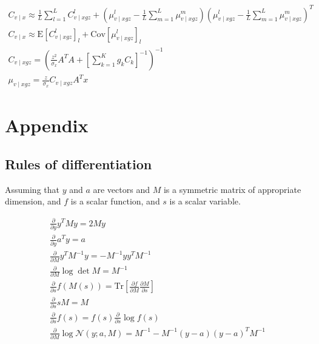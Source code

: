 \documentclass{paper}
\begin{document}
\begin{eqnarray}
C_{v \mid x} \approx \frac{1}{L} \sum_{l=1}^L C_{v \mid xgz}^l + ( \mu_{v \mid xgz}^l - \frac{1}{L} \sum_{m=1}^L \mu_{v \mid xgz}^m) ( \mu_{v \mid xgz}^l - \frac{1}{L} \sum_{m=1}^L \mu_{v \mid xgz}^m)^T \\
C_{v \mid x} \approx \mathrm{E} \left[ C_{v \mid xgz}^l \right]_l + \mathrm{Cov} \left[\mu_{v \mid xgz}^l \right]_l \\
C_{v \mid xgz} =  \left(\frac{z^2}{\sigma_x} A^T A + \left[\sum_{k=1}^K g_k C_k \right]^{-1}\right)^{-1} \\
\mu_{v \mid xgz} = \frac{z}{\sigma_x} C_{v \mid xgz} A^T x
\end{eqnarray}

\section{Appendix}

\subsection{Rules of differentiation}

Assuming that $y$ and $a$ are vectors and $M$ is a symmetric matrix of appropriate dimension, and $f$ is a scalar function, and $s$ is a scalar variable.

\begin{eqnarray}
\frac{\partial}{\partial y} y^T M y = 2 M y \label{eq:deriv_quadratic} \\
\frac{\partial}{\partial y} a^T y = a \label{eq:deriv_scalarprod} \\
\frac{\partial}{\partial M} y^T M^{-1} y = - M^{-1} yy^T M^{-1} \label{eq:deriv_quad_mat} \\
\frac{\partial}{\partial M} \log \det M = M^{-1} \label{eq:deriv_logdet} \\
\frac{\partial}{\partial s} f(M(s)) = \textrm{Tr} \left[ \frac{\partial f}{\partial M} \frac{\partial M}{\partial s} \right] \label{eq:deriv_chain} \\
\frac{\partial}{\partial s} s M = M \label{eq:deriv_scalar} \\
\frac{\partial}{\partial s} f(s) = f(s) \frac{\partial}{\partial s} \log f(s) \label{eq:deriv_function} \\
\frac{\partial}{\partial M} \log \mathcal{N}(y;a,M) = M^{-1} - M^{-1}(y-a)(y-a)^TM^{-1} \label{eq:deriv_gausscov}
\end{eqnarray}
\end{document}
